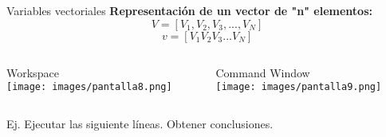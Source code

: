 \documentclass{bredelebeamer}
\begin{document}
\begin{frame}{Variables vectoriales}
\textbf{Representación de un vector de "n" elementos:}
\begin{equation*}
V = [V_1,V_2,V_3,...,V_N]
\end{equation*}
\begin{equation*}
v = [V_1 V_2 V_3 ... V_N]
\end{equation*}
\begin{columns}
\begin{column}{0.5\textwidth}
\begin{center}
Workspace\\
\texttt{[image: images/pantalla8.png]}
\end{center}
\end{column}
\begin{column}{0.5\textwidth}
\begin{center}
Command Window\\
\texttt{[image: images/pantalla9.png]}
\end{center}
\end{column}
\end{columns}
Ej. Ejecutar las siguiente líneas. Obtener conclusiones.
\end{frame}
\end{document}
